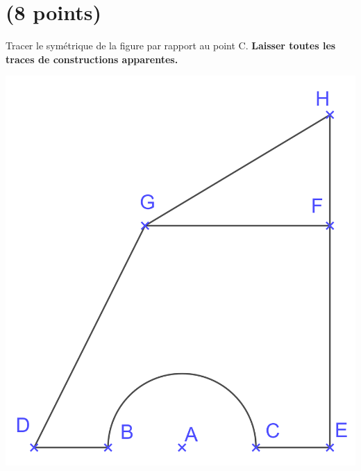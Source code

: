 \documentclass[a4paper,11pt]{exam}
\begin{document}
\newpage 
\section{(8 points)}

Tracer le symétrique de la figure par rapport au point C.\textbf{ Laisser toutes les traces de constructions apparentes.}

\begin{center}
	\includegraphics[scale=0.2]{img/fig2_2}
\end{center}
\label{LastPage}
\end{document}
